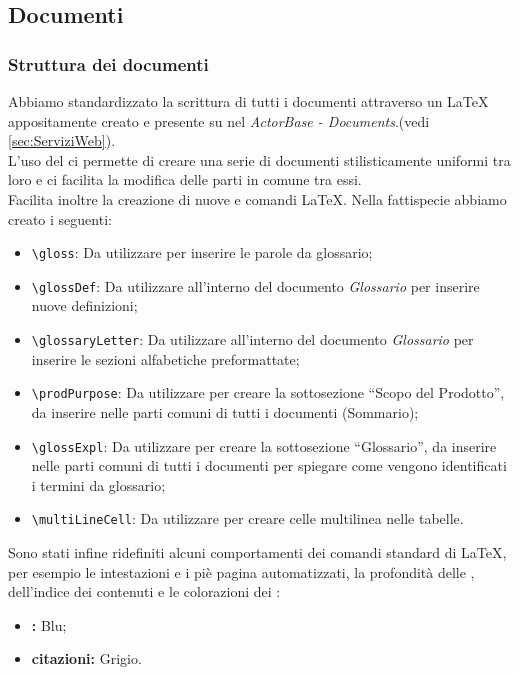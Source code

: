 \documentclass{scalatekids-article}
\begin{document}
\subsection{Documenti}
\subsubsection{Struttura dei documenti}
\label{sec:strutturadoc}
Abbiamo standardizzato la scrittura di tutti i documenti attraverso un
 \LaTeX\xspace appositamente creato e presente su
\textit{} nel  \textit{ActorBase -
  Documents}.(vedi \ref{sec:ServiziWeb}).\\ L'uso del  ci permette di creare una serie di documenti
stilisticamente uniformi tra loro e ci facilita la modifica delle parti in
comune tra essi.\\Facilita inoltre la creazione di nuove  e comandi
\LaTeX\xspace. Nella fattispecie abbiamo creato i seguenti:
\begin{itemize}
\item\verb=\gloss=: Da utilizzare per inserire le parole da glossario;
\item\verb=\glossDef=: Da utilizzare all'interno del documento \textit{Glossario} per inserire nuove definizioni;
\item\verb=\glossaryLetter=: Da utilizzare all'interno del documento \textit{Glossario} per inserire le sezioni alfabetiche preformattate;
\item\verb=\prodPurpose=: Da utilizzare per creare la sottosezione ``Scopo del Prodotto'', da inserire nelle parti comuni di tutti i documenti (Sommario);
\item\verb=\glossExpl=: Da utilizzare per creare la sottosezione ``Glossario'', da inserire nelle parti comuni di tutti i documenti per spiegare come vengono identificati i termini da glossario;
\item\verb=\multiLineCell=: Da utilizzare per creare celle multilinea nelle tabelle.
\end{itemize}
Sono stati infine ridefiniti alcuni comportamenti dei comandi standard di
\LaTeX\xspace, per esempio le intestazioni e i piè pagina automatizzati, la
profondità delle , dell'indice dei contenuti e le colorazioni dei
:
\begin{itemize}
\item\textbf{:} Blu;
\item\textbf{citazioni:} Grigio.
\end{itemize}
\end{document}
